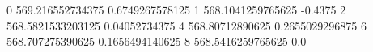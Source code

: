 0 569.216552734375 0.6749267578125
1 568.1041259765625 -0.4375
2 568.5821533203125 0.04052734375
4 568.80712890625 0.2655029296875
6 568.707275390625 0.1656494140625
8 568.5416259765625 0.0
